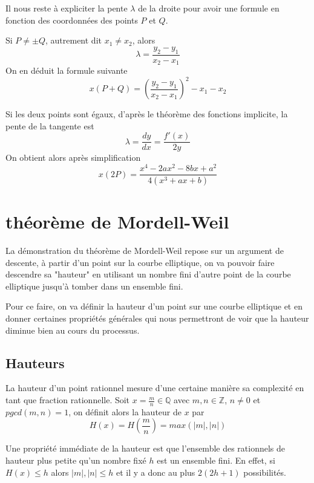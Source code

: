 \documentclass{article}
\begin{document}
Il nous reste à expliciter la pente $\lambda$ de la droite pour avoir une formule en fonction
des coordonnées des points $P$ et $Q$.

Si $P\neq \pm Q$, autrement dit $x_{1} \neq x_{2}$, alors
\begin{equation*}
\lambda = \frac{y_{2} - y_{1}}{x_{2} - x_{1}}
\end{equation*}
On en déduit la formule suivante
\begin{equation}
\label{P+Q}
x(P+Q) = (\frac{y_{2} - y_{1}}{x_{2} - x_{1}})^2 - x_{1} - x_{2}
\end{equation}

Si les deux points sont égaux, d'après le théorème des fonctions implicite, 
la pente de la tangente est
\begin{equation*}
\lambda = \frac{dy}{dx} = \frac{f'(x)}{2y}
\end{equation*}
On obtient alors après simplification
\begin{equation}
\label{2P}
x(2P) = \frac{x^4 - 2ax^2 - 8bx + a^2}{4(x^3 + ax + b)}
\end{equation}

\section{théorème de Mordell-Weil}
La démonstration du théorème de Mordell-Weil repose sur un argument de descente, à partir d'un point
sur la courbe elliptique, on va pouvoir faire descendre sa "hauteur" en utilisant un nombre fini d'autre point
de la courbe elliptique jusqu'à tomber dans un ensemble fini.

Pour ce faire, on va définir la hauteur d'un point sur une courbe elliptique et en donner certaines propriétés
générales qui nous permettront de voir que la hauteur diminue bien au cours du processus.

\subsection{Hauteurs}
La hauteur d'un point rationnel mesure d'une certaine manière sa complexité en tant que fraction rationnelle.
Soit $x=\frac{m}{n}\in \mathbb{Q}$ avec $m,n\in \mathbb{Z}$, $n\neq 0$ et $pgcd(m,n)=1$, on définit alors la 
hauteur de $x$ par 
\begin{equation*}
H(x) = H(\frac{m}{n}) = max(|m|,|n|)
\end{equation*}

Une propriété immédiate de la hauteur est que l'ensemble des rationnels de hauteur plus petite qu'un
nombre fixé $h$ est un ensemble fini. En effet, si $H(x) \leq h$ alors $|m|, |n| \leq h$ et il y a donc
au plus $2(2h+1)$ possibilités.
\end{document}
